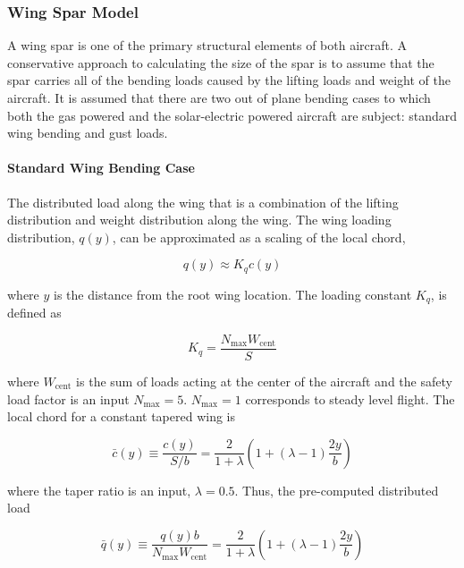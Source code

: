 \subsubsection{Wing Spar Model}

A wing spar is one of the primary structural elements of both aircraft. 
A conservative approach to calculating the size of the spar is to assume that the spar carries all of the bending loads caused by the lifting loads and weight of the aircraft.  
It is assumed that there are two out of plane bending cases to which both the gas powered and the solar-electric powered aircraft are subject: standard wing bending and gust loads. 


\paragraph{\textbf{Standard Wing Bending Case}} 
The distributed load along the wing that is a combination of the lifting distribution and weight distribution along the wing.
The wing loading distribution, $q(y)$, can be approximated as a scaling of the local chord,\cite{bending}

\begin{equation}
    \label{e:wingloading}
    q(y) \approx K_q c(y) 
\end{equation}

where $y$ is the distance from the root wing location. The loading constant $K_q$\cite{bending}, is defined as

\begin{equation}
    \label{e:kq}
    K_q = \frac{N_{\text{max}}W_{\text{cent}}}{S}
\end{equation}

where $W_{\text{cent}}$ is the sum of loads acting at the center of the aircraft and the safety load factor is an input $N_{\text{max}}=5$.  $N_{\text{max}}=1$ corresponds to steady level flight. The local chord for a constant tapered wing\cite{bending} is 

\begin{equation}
    \label{e:localchord}
    \bar{c}(y) \equiv \frac{c(y)}{S/b} = \frac{2}{1+\lambda} \left( 1 + (\lambda - 1) \frac{2y}{b} \right)
\end{equation}

where the taper ratio is an input, $\lambda=0.5$.  Thus, the pre-computed distributed load 

\begin{equation}
    \label{e:qbar}
    \bar{q}(y) \equiv \frac{q(y)b}{N_{\text{max}}W_{\text{cent}}} = \frac{2}{1+\lambda} \left( 1 + (\lambda - 1) \frac{2y}{b} \right)
\end{equation}

